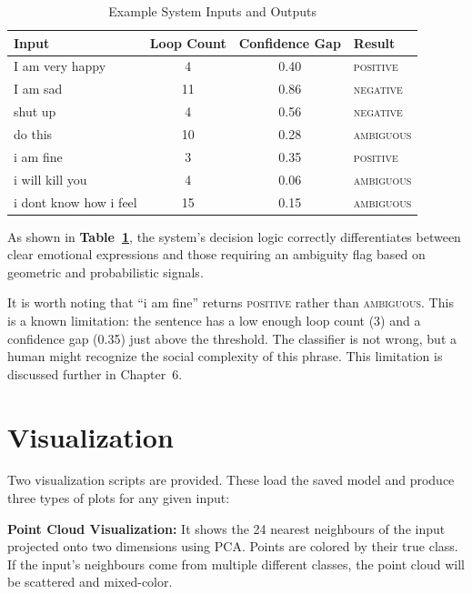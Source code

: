 \begin{table}[H]
\centering
\caption{Example System Inputs and Outputs}
\label{tab:ex_outputs}
\begin{tabular}{lccl}
\toprule
\textbf{Input} & \textbf{Loop Count} & \textbf{Confidence Gap} & \textbf{Result} \\
\midrule
I am very happy              & 4  & 0.40 & \textsc{positive} \\
I am sad                     & 11 & 0.86 & \textsc{negative} \\
shut up                      & 4  & 0.56 & \textsc{negative} \\
do this                      & 10 & 0.28 & \textsc{ambiguous} \\
i am fine                    & 3  & 0.35 & \textsc{positive} \\
i will kill you              & 4  & 0.06 & \textsc{ambiguous} \\
i dont know how i feel       & 15 & 0.15 & \textsc{ambiguous} \\
\bottomrule
\end{tabular}
\end{table}

As shown in \textbf{Table~\ref{tab:ex_outputs}}, the system's decision logic correctly differentiates
between clear emotional expressions and those requiring an ambiguity flag based on geometric
and probabilistic signals.

It is worth noting that ``i am fine'' returns \textsc{positive} rather than \textsc{ambiguous}.
This is a known limitation: the sentence has a low enough loop count (3) and a confidence gap
(0.35) just above the threshold. The classifier is not wrong, but a human might recognize the
social complexity of this phrase. This limitation is discussed further in Chapter~6.

\section{Visualization}

Two visualization scripts are provided. These load the saved model and produce three types of
plots for any given input:

\textbf{Point Cloud Visualization:} It shows the 24 nearest neighbours of the
input projected onto two dimensions using PCA. Points are colored by their true class. If the
input's neighbours come from multiple different classes, the point cloud will be scattered and
mixed-color.

